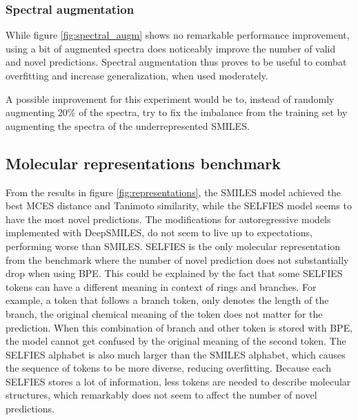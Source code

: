 \subsubsection*{Spectral augmentation}

While figure \ref{fig:spectral_augm} shows no remarkable performance improvement, using a bit of augmented spectra does noticeably improve the number of valid and novel predictions.
Spectral augmentation thus proves to be useful to combat overfitting and increase generalization, when used moderately.

A possible improvement for this experiment would be to, instead of randomly augmenting 20\% of the spectra, try to fix the imbalance from the training set by augmenting the spectra of the underrepresented SMILES.

\subsection{Molecular representations benchmark}

From the results in figure \ref{fig:representations}, the SMILES model achieved the best MCES distance and Tanimoto similarity, while the SELFIES model seems to have the most novel predictions.
The modifications for autoregressive models implemented with DeepSMILES, do not seem to live up to expectations, performing worse than SMILES.
SELFIES is the only molecular representation from the benchmark where the number of novel prediction does not substantially drop when using \ac{BPE}.
This could be explained by the fact that some SELFIES tokens can have a different meaning in context of rings and branches. 
For example, a token that follows a branch token, only denotes the length of the branch, the original chemical meaning of the token does not matter for the prediction.
When this combination of branch and other token is stored with \ac{BPE}, the model cannot get confused by the original meaning of the second token.
The SELFIES alphabet is also much larger than the SMILES alphabet, which causes the sequence of tokens to be more diverse, reducing overfitting.
Because each SELFIES stores a lot of information, less tokens are needed to describe molecular structures, which remarkably does not seem to affect the number of novel predictions.

